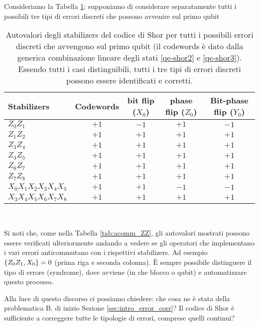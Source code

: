 \begin{esempio}
Consideriamo la Tabella \ref{tab:Shor_first_qubit_errors}: supponiamo di considerare separatamente tutti i possibili tre tipi di errori discreti che possono avvenire sul primo qubit
    \begin{table}[!hb]
	\centering
        \begin{tabular}{lcccc}
            \toprule
            Stabilizers & Codewords & bit flip ($X_0$) & phase flip ($Z_0$) & Bit-phase flip ($Y_0$) \\
            \midrule
            $Z_0Z_1$ & $+1$ & $-1$ & $+1$ & $-1$ \\
            $Z_1Z_2$ & $+1$ & $+1$ & $+1$ & $+1$ \\
            $Z_3Z_4$ & $+1$ & $+1$ & $+1$ & $+1$ \\
            $Z_4Z_5$ & $+1$ & $+1$ & $+1$ & $+1$ \\
            $Z_6Z_7$ & $+1$ & $+1$ & $+1$ & $+1$ \\
            $Z_7Z_8$ & $+1$ & $+1$ & $+1$ & $+1$ \\
            $X_0X_1X_2X_3X_4X_5$ & $+1$ & $+1$ & $-1$ & $-1$ \\
            $X_3X_4X_5X_6X_7X_8$ & $+1$ & $+1$ & $+1$ & $+1$ \\
            \bottomrule
        \end{tabular}\\
        \caption{Autovalori degli stabilizers del codice di Shor per tutti i possibili errori discreti che avvengono sul primo qubit (il codewords è dato dalla generica combinazione lineare degli stati \eqref{qe-shor2} e \eqref{qe-shor3}). Essendo tutti i casi distinguibili,  tutti i tre tipi di errori discreti possono essere identificati e corretti. }\label{tab:Shor_first_qubit_errors}
    \end{table}
    
    \noindent Si noti che, come nella Tabella \ref{tab:acomm_ZZ}, gli autovalori mostrati possono essere verificati ulteriormente andando a vedere se gli operatori che implementano i vari errori anticommutano con i rispettivi stabilizers. Ad esempio $\acomm{Z_0Z_1}{X_0}=0$ (prima riga e seconda colonna). È sempre possibile distinguere il tipo di errore (syndrome), dove avviene (in che blocco o qubit) e automatizzare questo processo.
\end{esempio}

\noindent Alla luce di questo discorso ci possiamo chiedere: che cosa ne è stata della problematica B. di inizio Sezione \ref{sec:intro_error_corr}? Il codice di Shor è sufficiente a correggere tutte le tipologie di errori, comprese quelli continui? 

